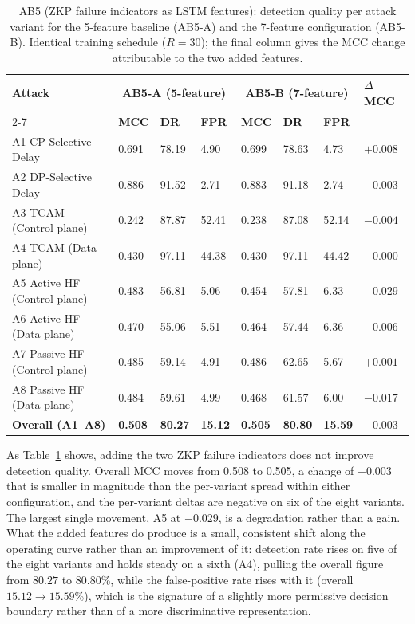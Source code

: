 \documentclass[12pt, a4paper]{report}
\begin{document}
{{\begin{table}[H]
\centering
\caption{AB5 (\ac{ZKP} failure indicators as \ac{LSTM}
features): detection quality per attack variant for the
5-feature baseline (AB5-A) and the 7-feature configuration
(AB5-B). Identical training schedule ($R = 30$); the final
column gives the \ac{MCC} change attributable to the two added
features.}
\label{tab:ab5_features}
\renewcommand{\arraystretch}{1.1}
\footnotesize
\begin{tabular}{|p{3.3cm}|p{1.0cm}|p{1.0cm}|p{1.0cm}|p{1.0cm}|p{1.0cm}|p{1.0cm}|p{1.2cm}|}
\hline
\textbf{Attack} & \multicolumn{3}{c|}{\textbf{AB5-A (5-feature)}}
& \multicolumn{3}{c|}{\textbf{AB5-B (7-feature)}} &
\textbf{$\Delta$ MCC} \\
\cline{2-7}
 & \textbf{MCC} & \textbf{DR} & \textbf{FPR} &
   \textbf{MCC} & \textbf{DR} & \textbf{FPR} & \\
\hline
A1 CP-Selective Delay & 0.691 & 78.19 & 4.90 & 0.699 & 78.63 & 4.73 & $+0.008$ \\
\hline
A2 DP-Selective Delay & 0.886 & 91.52 & 2.71 & 0.883 & 91.18 & 2.74 & $-0.003$ \\
\hline
A3 TCAM (Control plane) & 0.242 & 87.87 & 52.41 & 0.238 & 87.08 & 52.14 & $-0.004$ \\
\hline
A4 TCAM (Data plane) & 0.430 & 97.11 & 44.38 & 0.430 & 97.11 & 44.42 & $-0.000$ \\
\hline
A5 Active HF (Control plane) & 0.483 & 56.81 & 5.06 & 0.454 & 57.81 & 6.33 & $-0.029$ \\
\hline
A6 Active HF (Data plane) & 0.470 & 55.06 & 5.51 & 0.464 & 57.44 & 6.36 & $-0.006$ \\
\hline
A7 Passive HF (Control plane) & 0.485 & 59.14 & 4.91 & 0.486 & 62.65 & 5.67 & $+0.001$ \\
\hline
A8 Passive HF (Data plane) & 0.484 & 59.61 & 4.99 & 0.468 & 61.57 & 6.00 & $-0.017$ \\
\hline
\textbf{Overall (A1--A8)} & \textbf{0.508} & \textbf{80.27} &
\textbf{15.12} & \textbf{0.505} & \textbf{80.80} &
\textbf{15.59} & $\mathbf{-0.003}$ \\
\hline
\end{tabular}
\end{table}

As Table~\ref{tab:ab5_features} shows, adding the two \ac{ZKP}
failure indicators does not improve detection quality. Overall
\ac{MCC} moves from 0.508 to 0.505, a change of $-0.003$ that is
smaller in magnitude than the per-variant spread within either
configuration, and the per-variant deltas are negative on six of
the eight variants. The largest single movement, A5 at $-0.029$,
is a degradation rather than a gain. What the added features do
produce is a small, consistent shift along the operating curve
rather than an improvement of it: detection rate rises on five of the
eight variants and holds steady on a sixth (A4), pulling the overall
figure from $80.27$ to $80.80$\%, while the
false-positive rate rises with it (overall $15.12 \rightarrow
15.59$\%), which is the signature of a slightly more permissive
decision boundary rather than of a more discriminative
representation.

}}
\end{document}
